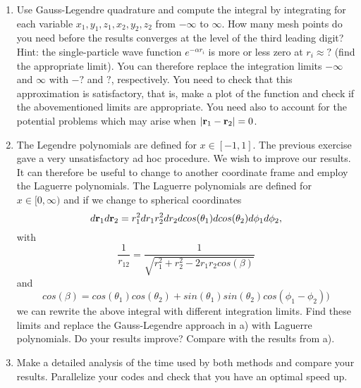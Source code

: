 \begin{prob}
\begin{enumerate}
\item Use Gauss-Legendre quadrature and compute the integral by integrating 
for each variable $x_1,y_1,z_1,x_2,y_2,z_2$ from $-\infty$ to $\infty$.
How many mesh points do you need before the results converges at the level of the third 
leading digit?  Hint:  the single-particle wave function $e^{-\alpha r_i}$  is more or less zero at
$r_i \approx ?$ (find the appropriate limit).  
You can therefore replace the integration limits $-\infty$ and $\infty$ with 
$-?$ and $?$, respectively.  You need to check that this approximation is satisfactory, that is, make a plot
of the function and check if the abovementioned limits are appropriate.
You need also to account for the potential problems which may arise when $|{\bf r}_1-{\bf r}_2|=0$.
\item   The Legendre polynomials are defined for $x\in [-1,1]$. The previous exercise gave a very unsatisfactory ad hoc procedure. We wish to improve our results. It can therefore be useful to change to another coordinate
frame
and employ the Laguerre polynomials. The Laguerre polynomials are defined for $x\in [0,\infty)$ and if we change
to spherical coordinates
\[
   d{\bf r}_1d{\bf r}_2  = r_1^2dr_1 r_2^2dr_2 dcos(\theta_1)dcos(\theta_2)d\phi_1d\phi_2,
\]
with
\[
   \frac{1}{r_{12}}= \frac{1}{\sqrt{r_1^2+r_2^2-2r_1r_2cos(\beta)}}
\]
and 
\[
cos(\beta) = cos(\theta_1)cos(\theta_2)+sin(\theta_1)sin(\theta_2)cos(\phi_1-\phi_2))
\]
we can rewrite the above integral with different integration limits. Find these limits and replace the Gauss-Legendre 
approach in a) with Laguerre polynomials. 
Do your results improve? Compare with the results from a).
\item Make a detailed analysis of the time used by both methods and compare your results.
Parallelize your codes and check that you have an optimal speed up. 
\end{enumerate}

\end{prob}
